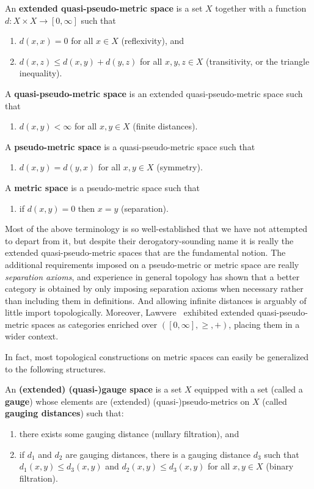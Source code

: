 \documentclass{article}
\def\Rp{[0,\infty]}
\begin{document}
\begin{defn}
  An \textbf{extended quasi-pseudo-metric space} is a set $X$ together with a function $d:X\times X \to \Rp$ such that
  \begin{enumerate}
  \item $d(x,x)=0$ for all $x\in X$ (reflexivity), and
  \item $d(x,z)\le d(x,y)+d(y,z)$ for all $x,y,z\in X$ (transitivity, or the triangle inequality).
  \end{enumerate}
  A \textbf{quasi-pseudo-metric space} is an extended quasi-pseudo-metric space such that
  \begin{enumerate}[resume]
  \item $d(x,y)<\infty$ for all $x,y\in X$ (finite distances).
  \end{enumerate}
  A \textbf{pseudo-metric space} is a quasi-pseudo-metric space such that
  \begin{enumerate}[resume]
  \item $d(x,y)=d(y,x)$ for all $x,y\in X$ (symmetry).
  \end{enumerate}
  A \textbf{metric space} is a pseudo-metric space such that
  \begin{enumerate}[resume]
  \item if $d(x,y)=0$ then $x=y$ (separation).
  \end{enumerate}
\end{defn}

Most of the above terminology is so well-established that we have not attempted to depart from it, but despite their derogatory-sounding name it is really the extended quasi-pseudo-metric spaces that are the fundamental notion.
The additional requirements imposed on a pseudo-metric or metric space are really \emph{separation axioms}, and experience in general topology has shown that a better category is obtained by only imposing separation axioms when necessary rather than including them in definitions.
And allowing infinite distances is arguably of little import topologically.
Moreover, Lawvere~\cite{lawvere:metric-spaces} exhibited extended quasi-pseudo-metric spaces as categories enriched over $(\Rp,\ge,+)$, placing them in a wider context.

In fact, most topological constructions on metric spaces can easily be generalized to the following structures.

\begin{defn}
  An \textbf{(extended) (quasi-)gauge space} is a set $X$ equipped with a set (called a \textbf{gauge}) whose elements are (extended) (quasi-)pseudo-metrics on $X$ (called \textbf{gauging distances}) such that:
  \begin{enumerate}
  \item there exists some gauging distance (nullary filtration), and
  \item if $d_1$ and $d_2$ are gauging distances, there is a gauging distance $d_3$ such that $d_1(x,y)\le d_3(x,y)$ and $d_2(x,y)\le d_3(x,y)$ for all $x,y\in X$ (binary filtration).
  \end{enumerate}
\end{defn}
\end{document}
